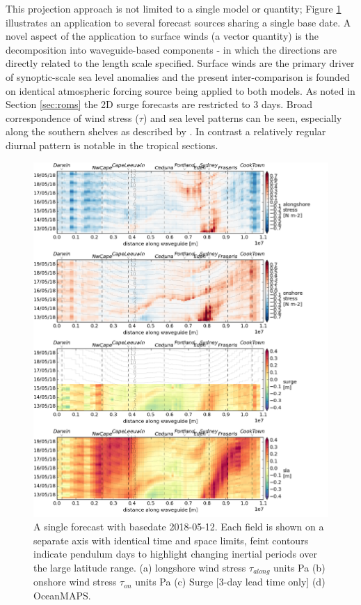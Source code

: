 This projection approach is not limited to a single model or quantity; Figure \ref{fig:collate_g} illustrates an application to several forecast sources sharing a single base date.
A novel aspect of the application to surface winds (a vector quantity) is the decomposition into waveguide-based components - in which the directions are directly related to the length scale specified.
Surface winds are the primary driver of synoptic-scale sea level anomalies and the present inter-comparison is founded on identical atmospheric forcing source being applied to both models. As noted in Section \ref{sec:roms} the 2D surge forecasts are restricted to 3 days.
Broad correspondence of wind stress ($\tau$) and sea level patterns can be seen, especially along the southern shelves as described by \citep{McInnes:2003vl}.
In contrast a relatively regular diurnal pattern is notable in the tropical sections.
\begin{figure}[H]\centering
    \noindent\includegraphics[width=\figwidthFull]{figures/plots/collate_g.png}
    \caption[Forecast with basedate 2018-05-12]
            {A single forecast with basedate 2018-05-12.  Each field is shown on a separate axis with identical time and space limits, feint contours indicate pendulum days to highlight changing inertial periods over the large latitude range. (a) longshore wind stress $\tau_{along}$ units Pa (b) onshore wind stress $\tau_{on}$ units Pa (c) Surge [3-day lead time only] (d) OceanMAPS.}
    \label{fig:collate_g}
\end{figure}  
